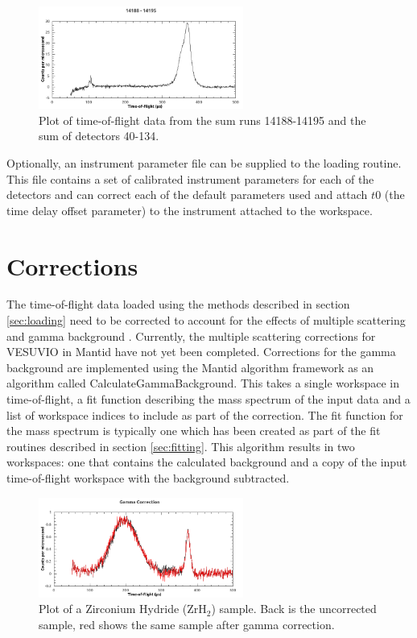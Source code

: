\documentclass[paper=a4, fontsize=11pt]{scrartcl}	%
\numberwithin{equation}{section}															%
\numberwithin{figure}{section}																%
\numberwithin{table}{section}
\begin{document}
\begin{figure}[H]
\centering
\includegraphics[width=0.6\textwidth]{img/tof-spectrum.png}
\caption{Plot of time-of-flight data from the sum runs 14188-14195 and the sum of detectors 40-134.}
\label{fig:tof-spectrum}
\end{figure}

Optionally, an instrument parameter file can be supplied to the loading routine. This file contains a set of calibrated instrument parameters for each of the detectors and can correct each of the default parameters used and attach $t0$ (the time delay offset parameter) to the instrument attached to the workspace. 

\section{Corrections}
\label{sec:corrections}
The time-of-flight data loaded using the methods described in section \ref{sec:loading} need to be corrected to account for the effects of multiple scattering \citep{mayers2002multiple} and gamma background \citep{mayers2011calculation}. Currently, the multiple scattering corrections for VESUVIO in Mantid have not yet been completed. Corrections for the gamma background are implemented using the Mantid algorithm framework as an algorithm called CalculateGammaBackground. This takes a single workspace in time-of-flight, a fit function describing the mass spectrum of the input data and a list of workspace indices to include as part of the correction. The fit function for the mass spectrum is typically one which has been created as part of the fit routines described in section \ref{sec:fitting}. This algorithm results in two workspaces: one that contains the calculated background and a copy of the input time-of-flight workspace with the background subtracted.

\begin{figure}[H]
\centering
\includegraphics[width=0.6\textwidth]{img/corrections-gamma.png}
\caption{Plot of a Zirconium Hydride (ZrH$_2$) sample. Back is the uncorrected sample, red shows the same sample after gamma correction.}
\label{fig:corrections-gamma}
\end{figure}
\end{document}
